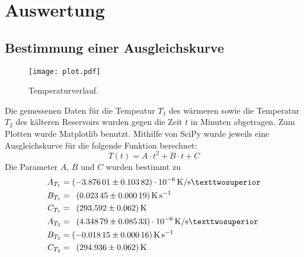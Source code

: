 \section{Auswertung}
\label{sec:Auswertung}

\subsection{Bestimmung einer Ausgleichskurve}
\begin{figure}[H]
  \centering
  \texttt{[image: plot.pdf]}
  \caption{Temperaturverlauf.}
  \label{fig:plot}
\end{figure}
Die gemessenen Daten für die Tempeatur $T_1$ des wärmeren sowie die Temperatur
$T_2$ des kälteren Reservoirs wurden gegen die Zeit $t$ in Minuten abgetragen.
Zum Plotten wurde Matplotlib \cite{matplotlib} benutzt.
Mithilfe von SciPy \cite{scipy} wurde jeweils eine Ausgleichskurve für die folgende Funktion
berechnet:
\begin{equation}
  T(t)=A \cdot t^2 + B \cdot t + C
\end{equation}
Die Parameter $A$, $B$ und $C$ wurden bestimmt zu
\begin{align*}
A_{T_1} &= \SI{-3.87601 +- 0.10382e-6}{\kelvin\per\second²} \\
B_{T_1} &= \phantom{1}\SI{0.02345 +- 0.00019}{\kelvin\per\second} \\
C_{T_1} &= \phantom{1}\SI{293.592 +- 0.062}{\kelvin} \\
A_{T_2} &= \phantom{1}\SI{4.34879 +- 0.08533e-6}{\kelvin\per\second²}  \\
 B_{T_2} &= \SI{-0.01815 +- 0.00016}{\kelvin\per\second} \\
  C_{T_2} &= \phantom{1}\SI{294.936 +- 0.062}{\kelvin}
\end{align*}

